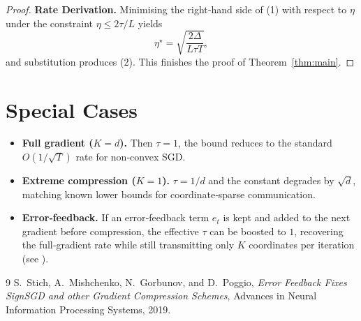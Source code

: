 \documentclass{article}
\begin{document}
\begin{proof}
\medskip

\noindent\textbf{Rate Derivation.} Minimising the right‑hand side of (1) with
respect to $\eta$ under the constraint $\eta\le2\tau/L$ yields
\[
\eta^{\star}= \sqrt{\frac{2\Delta}{L\tau T}},
\]
and substitution produces (2). This finishes the proof of Theorem~\ref{thm:main}.
\end{proof}

\section*{Special Cases}
\begin{itemize}
\item \textbf{Full gradient ($K=d$).} Then $\tau=1$, the bound reduces to the
standard $O(1/\sqrt{T})$ rate for non‑convex SGD.
\item \textbf{Extreme compression ($K=1$).} $\tau=1/d$ and the constant
degrades by $\sqrt{d}$, matching known lower bounds for coordinate‑sparse
communication.
\item \textbf{Error‑feedback.} If an error‑feedback term $e_{t}$ is kept and
added to the next gradient before compression, the effective $\tau$ can be
boosted to $1$, recovering the full‑gradient rate while still transmitting
only $K$ coordinates per iteration (see \cite{stich19error}).
\end{itemize}

\begin{thebibliography}{9}
S.~Stich, A.~Mishchenko, N.~Gorbunov, and D.~Poggio,
\emph{Error Feedback Fixes SignSGD and other Gradient Compression Schemes},
Advances in Neural Information Processing Systems, 2019.
\end{thebibliography}
\end{document}
